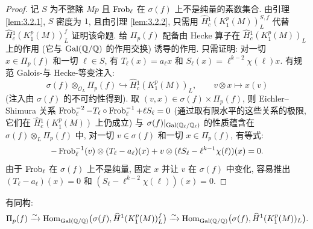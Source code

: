 \begin{proof}
记 $S$ 为不整除 $Mp$ 且 $\operatorname{Frob}_{\ell}$ 在 $\sigma(f)$ 上不是纯量的素数集合.
由引理 \ref{lem:3.2.1}, $S$ 密度为 $1$, 且由引理 \ref{lem:3.2.2}, 只需用 $\widehat{H}{}_{c}^{1}(K_1^{p}(M))_L^{S,f}$ 代替 $\widehat{H}{}_{c}^{1}(K_1^{p}(M))_L^{f}$ 证明该命题.
给 $\Pi_p(f)$ 配备由 Hecke 算子在 $\widehat{H}{}_{c}^{1}(K_1^{p}(M))_L$ 上的作用 (它与 $\operatorname{Gal}(\mathbb{Q}/\mathbb{Q})$ 的作用交换) 诱导的作用.
只需证明: 对一切 $x \in \Pi_p(f)$ 和一切 $\ell \in S$, 有 $T_{\ell}(x) = a_{\ell}x$ 和 $S_{\ell}(x) = \ell^{k-2}\chi(\ell)x$.
有规范 Galois-与 Hecke-等变注入:
\[
\sigma(f) \otimes_{\mathcal{O}_L} \Pi_p(f) \hookrightarrow \widehat{H}{}_{c}^{1}(K_1^{p}(M))_L,\qquad v \otimes x \mapsto x(v)
\]
(注入由 $\sigma(f)$ 的不可约性得到).
取 $(v,x) \in \sigma(f) \times \Pi_p(f)$, 则 Eichler--Shimura 关系 $\operatorname{Frob}_{\ell}^{-2} - T_{\ell} \circ \operatorname{Frob}_{\ell}^{-1} + \ell S_{\ell} = 0$ (通过取有限水平的这些关系的极限, 它们在 $\widehat{H}{}_{c}^{1}(K_1^{p}(M))$ 上仍成立) 与 $\sigma(f)|_{\operatorname{Gal}(\mathbb{Q}_{\ell}/\mathbb{Q}_{\ell})}$ 的性质蕴含在 $\sigma(f) \otimes_L \Pi_p(f)$ 中, 对一切 $v \in \sigma(f)$ 和一切 $x \in \Pi_p(f)$, 有等式:
\[
-\operatorname{Frob}_{\ell}^{-1}(v) \otimes (T_{\ell} - a_{\ell})(x) + v \otimes (\ell S_{\ell} - \ell^{k-1}\chi(\ell))(x) = 0.
\]
由于 $\operatorname{Frob}_{\ell}$ 在 $\sigma(f)$ 上不是纯量, 固定 $x$ 并让 $v$ 在 $\sigma(f)$ 中变化, 容易推出 $(T_{\ell} - a_{\ell})(x) = 0$ 和 $(S_{\ell} - \ell^{k-2}\chi(\ell))(x) = 0$.
\end{proof}

\begin{proposition}\label{prop:3.2.4}
有同构:
\[
\Pi_p(f) \xrightarrow{\sim} \operatorname{Hom}_{\operatorname{Gal}(\mathbb{Q}/\mathbb{Q})}\bigl(\sigma(f),\widehat{H}{}^{1}(K_1^{p}(M))_L^{f}\bigr)
\xrightarrow{\sim} \operatorname{Hom}_{\operatorname{Gal}(\mathbb{Q}/\mathbb{Q})}\bigl(\sigma(f),\widehat{H}{}^{1}(K_1^{p}(M))_L\bigr).
\]
\end{proposition}

